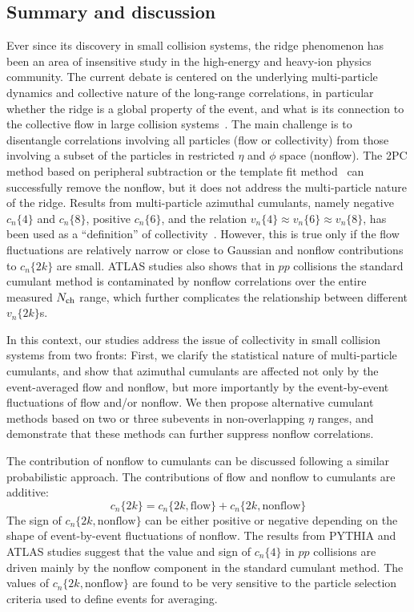 \subsection{Summary and discussion}

Ever since its discovery in small collision systems, the ridge phenomenon has been an area of insensitive study in the high-energy and heavy-ion physics community. The current debate is centered on the underlying multi-particle dynamics and collective nature of the long-range correlations, in particular whether the ridge is a global property of the event, and what is its connection to the collective flow in large collision systems~\cite{Dusling:2015gta, Schlichting:2016sqo}. The main challenge is to disentangle correlations involving all particles (flow or collectivity) from those involving a subset of the particles in restricted $\eta$ and $\phi$ space (nonflow). The 2PC method based on peripheral subtraction or the template fit method~\cite{Aad:2015gqa, Aaboud:2016yar, Aad:2014lta} can successfully remove the nonflow, but it does not address the multi-particle nature of the ridge. Results from multi-particle azimuthal cumulants, namely negative $c_n\{4\}$ and $c_n\{8\}$, positive $c_n\{6\}$, and the relation $v_n\{4\} \approx v_n\{6\} \approx v_n\{8\}$, has been used as a ``definition'' of collectivity~\cite{Khachatryan:2015waa, Khachatryan:2016txc}. However, this is true only if the flow fluctuations are relatively narrow or close to Gaussian and nonflow contributions to $c_n\{2k\}$ are small. ATLAS studies also shows that in $pp$ collisions the standard cumulant method is contaminated by nonflow correlations over the entire measured $N_\text{ch}$ range, which further complicates the relationship between different $v_n\{2k\}$s.

In this context, our studies address the issue of collectivity in small collision systems from two fronts: First, we clarify the statistical nature of multi-particle cumulants, and show that azimuthal cumulants are affected not only by the event-averaged flow and nonflow, but more importantly by the event-by-event fluctuations of flow and/or nonflow. We then propose alternative cumulant methods based on two or three subevents in non-overlapping $\eta$ ranges, and demonstrate that these methods can further suppress nonflow correlations.

The contribution of nonflow to cumulants can be discussed following a similar probabilistic approach. The contributions of flow and nonflow to cumulants are additive:
\begin{equation}
c_n\{2k\} = c_n\{2k, \text{flow}\} + c_n\{2k, \text{nonflow}\}
\end{equation}
The sign of $c_n\{2k,\text{nonflow}\}$ can be either positive or negative depending on the shape of event-by-event fluctuations of nonflow. The results from PYTHIA and ATLAS studies suggest that the value and sign of $c_n\{4\}$ in $pp$ collisions are driven mainly by the nonflow component in the standard cumulant method. The values of $c_n\{2k,\text{nonflow}\}$ are found to be very sensitive to the particle selection criteria used to define events for averaging.

